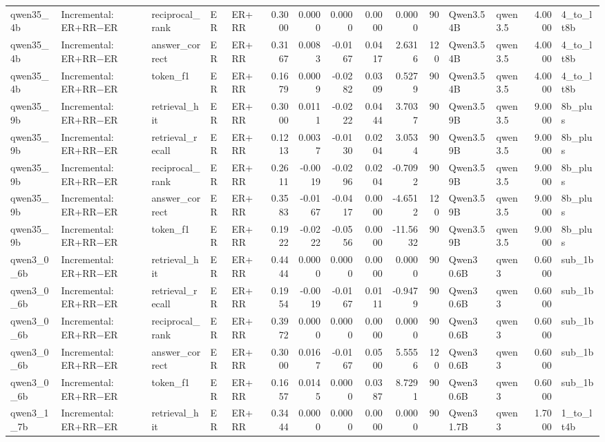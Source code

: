 \begin{tabular}{lllllrrrrrrllrl}
qwen35_4b & Incremental: ER+RR−ER & reciprocal_rank & ER & ER+RR & 0.3000 & 0.0000 & 0.0000 & 0.0000 & 0.0000 & 90 & Qwen3.5 4B & qwen3.5 & 4.0000 & 4_to_lt8b \\
qwen35_4b & Incremental: ER+RR−ER & answer_correct & ER & ER+RR & 0.3167 & 0.0083 & -0.0167 & 0.0417 & 2.6316 & 120 & Qwen3.5 4B & qwen3.5 & 4.0000 & 4_to_lt8b \\
qwen35_4b & Incremental: ER+RR−ER & token_f1 & ER & ER+RR & 0.1679 & 0.0009 & -0.0282 & 0.0309 & 0.5279 & 90 & Qwen3.5 4B & qwen3.5 & 4.0000 & 4_to_lt8b \\
qwen35_9b & Incremental: ER+RR−ER & retrieval_hit & ER & ER+RR & 0.3000 & 0.0111 & -0.0222 & 0.0444 & 3.7037 & 90 & Qwen3.5 9B & qwen3.5 & 9.0000 & 8b_plus \\
qwen35_9b & Incremental: ER+RR−ER & retrieval_recall & ER & ER+RR & 0.1213 & 0.0037 & -0.0130 & 0.0204 & 3.0534 & 90 & Qwen3.5 9B & qwen3.5 & 9.0000 & 8b_plus \\
qwen35_9b & Incremental: ER+RR−ER & reciprocal_rank & ER & ER+RR & 0.2611 & -0.0019 & -0.0296 & 0.0204 & -0.7092 & 90 & Qwen3.5 9B & qwen3.5 & 9.0000 & 8b_plus \\
qwen35_9b & Incremental: ER+RR−ER & answer_correct & ER & ER+RR & 0.3583 & -0.0167 & -0.0417 & 0.0000 & -4.6512 & 120 & Qwen3.5 9B & qwen3.5 & 9.0000 & 8b_plus \\
qwen35_9b & Incremental: ER+RR−ER & token_f1 & ER & ER+RR & 0.1922 & -0.0222 & -0.0556 & 0.0000 & -11.5632 & 90 & Qwen3.5 9B & qwen3.5 & 9.0000 & 8b_plus \\
qwen3_0_6b & Incremental: ER+RR−ER & retrieval_hit & ER & ER+RR & 0.4444 & 0.0000 & 0.0000 & 0.0000 & 0.0000 & 90 & Qwen3 0.6B & qwen3 & 0.6000 & sub_1b \\
qwen3_0_6b & Incremental: ER+RR−ER & retrieval_recall & ER & ER+RR & 0.1954 & -0.0019 & -0.0167 & 0.0111 & -0.9479 & 90 & Qwen3 0.6B & qwen3 & 0.6000 & sub_1b \\
qwen3_0_6b & Incremental: ER+RR−ER & reciprocal_rank & ER & ER+RR & 0.3972 & 0.0000 & 0.0000 & 0.0000 & 0.0000 & 90 & Qwen3 0.6B & qwen3 & 0.6000 & sub_1b \\
qwen3_0_6b & Incremental: ER+RR−ER & answer_correct & ER & ER+RR & 0.3000 & 0.0167 & -0.0167 & 0.0500 & 5.5556 & 120 & Qwen3 0.6B & qwen3 & 0.6000 & sub_1b \\
qwen3_0_6b & Incremental: ER+RR−ER & token_f1 & ER & ER+RR & 0.1657 & 0.0145 & 0.0000 & 0.0387 & 8.7291 & 90 & Qwen3 0.6B & qwen3 & 0.6000 & sub_1b \\
qwen3_1_7b & Incremental: ER+RR−ER & retrieval_hit & ER & ER+RR & 0.3444 & 0.0000 & 0.0000 & 0.0000 & 0.0000 & 90 & Qwen3 1.7B & qwen3 & 1.7000 & 1_to_lt4b \\

\end{tabular}
